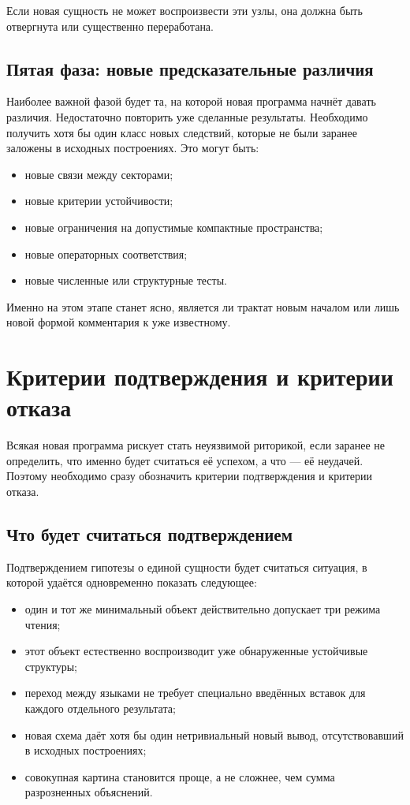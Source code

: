 \documentclass[12pt,a4paper]{article}
\begin{document}
Если новая сущность не может воспроизвести эти узлы, она должна быть отвергнута или существенно переработана.

\subsection{Пятая фаза: новые предсказательные различия}

Наиболее важной фазой будет та, на которой новая программа начнёт давать различия. Недостаточно повторить уже сделанные результаты. Необходимо получить хотя бы один класс новых следствий, которые не были заранее заложены в исходных построениях. Это могут быть:
\begin{itemize}
    \item новые связи между секторами;
    \item новые критерии устойчивости;
    \item новые ограничения на допустимые компактные пространства;
    \item новые операторных соответствия;
    \item новые численные или структурные тесты.
\end{itemize}

Именно на этом этапе станет ясно, является ли трактат новым началом или лишь новой формой комментария к уже известному.

\section{Критерии подтверждения и критерии отказа}

Всякая новая программа рискует стать неуязвимой риторикой, если заранее не определить, что именно будет считаться её успехом, а что --- её неудачей. Поэтому необходимо сразу обозначить критерии подтверждения и критерии отказа.

\subsection{Что будет считаться подтверждением}

Подтверждением гипотезы о единой сущности будет считаться ситуация, в которой удаётся одновременно показать следующее:
\begin{itemize}
    \item один и тот же минимальный объект действительно допускает три режима чтения;
    \item этот объект естественно воспроизводит уже обнаруженные устойчивые структуры;
    \item переход между языками не требует специально введённых вставок для каждого отдельного результата;
    \item новая схема даёт хотя бы один нетривиальный новый вывод, отсутствовавший в исходных построениях;
    \item совокупная картина становится проще, а не сложнее, чем сумма разрозненных объяснений.
\end{itemize}
\end{document}
